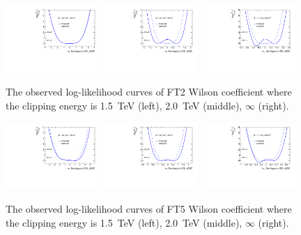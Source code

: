 \begin{figure}[ht]
    \centering
    \includegraphics[width=0.32\textwidth]{figures/aQGC/profileFT21500}
    	\includegraphics[width=0.32\textwidth]{figures/aQGC/profileFT22000}
        \includegraphics[width=0.32\textwidth]{figures/aQGC/profileFT2inf}
        \caption{The observed log-likelihood curves of FT2 Wilson coefficient where the clipping energy is 1.5~TeV (left), 2.0~TeV (middle), $\infty$ (right).}
        \label{fig:ProfileLLFT2}
\end{figure}
\begin{figure}[ht]
    \centering
    \includegraphics[width=0.32\textwidth]{figures/aQGC/profileFT51500}
    	\includegraphics[width=0.32\textwidth]{figures/aQGC/profileFT52000}
        \includegraphics[width=0.32\textwidth]{figures/aQGC/profileFT5inf}
        \caption{The observed log-likelihood curves of FT5 Wilson coefficient where the clipping energy is 1.5~TeV (left), 2.0~TeV (middle), $\infty$ (right).}
        \label{fig:ProfileLLFT5}
\end{figure}
